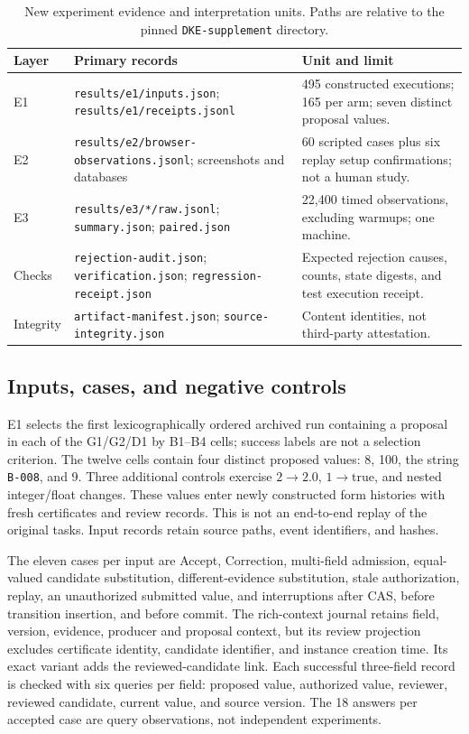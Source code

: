 \documentclass[11pt,a4paper]{article}
\newcommand{\code}[1]{\nolinkurl{#1}}
\begin{document}
\begin{table}[htbp]
\centering\small
\caption{New experiment evidence and interpretation units. Paths are relative to the pinned \code{DKE-supplement} directory.}
\begin{tabularx}{\textwidth}{@{}l>{\raggedright\arraybackslash}p{}X@{}}
\toprule
Layer & Primary records & Unit and limit \\
\midrule
E1 & \code{results/e1/inputs.json}; \code{results/e1/receipts.jsonl} & 495 constructed executions; 165 per arm; seven distinct proposal values. \\
E2 & \code{results/e2/browser-observations.jsonl}; screenshots and databases & 60 scripted cases plus six replay setup confirmations; not a human study. \\
E3 & \code{results/e3/*/raw.jsonl}; \code{summary.json}; \code{paired.json} & 22,400 timed observations, excluding warmups; one machine. \\
Checks & \code{rejection-audit.json}; \code{verification.json}; \code{regression-receipt.json} & Expected rejection causes, counts, state digests, and test execution receipt. \\
Integrity & \code{artifact-manifest.json}; \code{source-integrity.json} & Content identities, not third-party attestation. \\
\bottomrule
\end{tabularx}
\end{table}

\subsection{Inputs, cases, and negative controls}

E1 selects the first lexicographically ordered archived run containing a proposal in each of the G1/G2/D1 by B1--B4 cells; success labels are not a selection criterion. The twelve cells contain four distinct proposed values: 8, 100, the string \code{B-008}, and 9. Three additional controls exercise $2\rightarrow2.0$, $1\rightarrow\mathrm{true}$, and nested integer/float changes. These values enter newly constructed form histories with fresh certificates and review records. This is not an end-to-end replay of the original tasks. Input records retain source paths, event identifiers, and hashes.

The eleven cases per input are Accept, Correction, multi-field admission, equal-valued candidate substitution, different-evidence substitution, stale authorization, replay, an unauthorized submitted value, and interruptions after CAS, before transition insertion, and before commit. The rich-context journal retains field, version, evidence, producer and proposal context, but its review projection excludes certificate identity, candidate identifier, and instance creation time. Its exact variant adds the reviewed-candidate link. Each successful three-field record is checked with six queries per field: proposed value, authorized value, reviewer, reviewed candidate, current value, and source version. The 18 answers per accepted case are query observations, not independent experiments.
\end{document}
